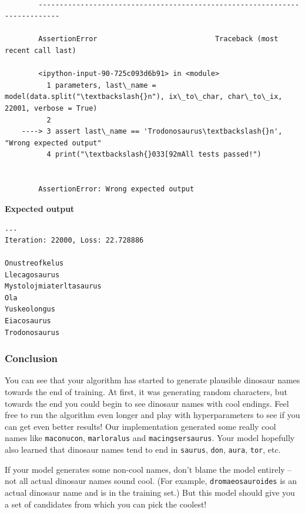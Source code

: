 \documentclass[11pt]{article}
\begin{document}
    \begin{Verbatim}[commandchars=\\\{\}]

        ---------------------------------------------------------------------------

        AssertionError                            Traceback (most recent call last)

        <ipython-input-90-725c093d6b91> in <module>
          1 parameters, last\_name = model(data.split("\textbackslash{}n"), ix\_to\_char, char\_to\_ix, 22001, verbose = True)
          2 
    ----> 3 assert last\_name == 'Trodonosaurus\textbackslash{}n', "Wrong expected output"
          4 print("\textbackslash{}033[92mAll tests passed!")


        AssertionError: Wrong expected output

    \end{Verbatim}

    \textbf{Expected output}

\begin{verbatim}
...
Iteration: 22000, Loss: 22.728886

Onustreofkelus
Llecagosaurus
Mystolojmiaterltasaurus
Ola
Yuskeolongus
Eiacosaurus
Trodonosaurus
\end{verbatim}

    \hypertarget{conclusion}{%
\subsubsection{Conclusion}\label{conclusion}}

You can see that your algorithm has started to generate plausible
dinosaur names towards the end of training. At first, it was generating
random characters, but towards the end you could begin to see dinosaur
names with cool endings. Feel free to run the algorithm even longer and
play with hyperparameters to see if you can get even better results! Our
implementation generated some really cool names like \texttt{maconucon},
\texttt{marloralus} and \texttt{macingsersaurus}. Your model hopefully
also learned that dinosaur names tend to end in \texttt{saurus},
\texttt{don}, \texttt{aura}, \texttt{tor}, etc.

If your model generates some non-cool names, don't blame the model
entirely -- not all actual dinosaur names sound cool. (For example,
\texttt{dromaeosauroides} is an actual dinosaur name and is in the
training set.) But this model should give you a set of candidates from
which you can pick the coolest!
\end{document}
